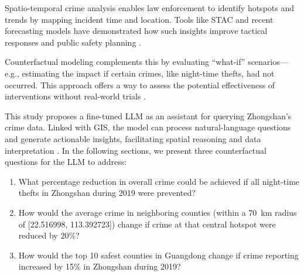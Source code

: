 Spatio-temporal crime analysis enables law enforcement to identify hotspots and trends by mapping incident time and location. Tools like STAC and recent forecasting models have demonstrated how such insights improve tactical responses and public safety planning \cite{Li2024UrbanGPT}.

Counterfactual modeling complements this by evaluating “what-if” scenarios—e.g., estimating the impact if certain crimes, like night-time thefts, had not occurred. This approach offers a way to assess the potential effectiveness of interventions without real-world trials \cite{CONSTANTINOU201641}.

This study proposes a fine-tuned LLM as an assistant for querying Zhongshan’s crime data. Linked with GIS, the model can process natural-language questions and generate actionable insights, facilitating spatial reasoning and data interpretation \cite{William2025}.
\noindent In the following sections, we present three counterfactual questions for the LLM to address:
\begin{enumerate}
  \item What percentage reduction in overall crime could be achieved if all night-time thefts in Zhongshan during 2019 were prevented?
  \item How would the average crime in neighboring counties (within a 70~km radius of [22.516998, 113.392723]) change if crime at that central hotspot were reduced by 20\%?
  \item How would the top 10 safest counties in Guangdong change if crime reporting increased by 15\% in Zhongshan during 2019?
\end{enumerate}

